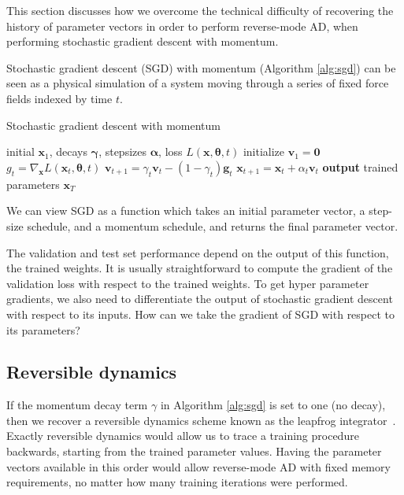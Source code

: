 \documentclass{article}
\newcommand{\vx}{\mathbf{x}}
\newcommand{\vv}{\mathbf{v}}
\newcommand{\vg}{\mathbf{g}}
\newcommand{\vzero}{\mathbf{0}}
\newcommand{\hypers}{{\boldsymbol{\theta}}}
\newcommand{\params}{\vx}
\newcommand{\decay}{\gamma}
\newcommand{\decays}{{\boldsymbol{\decay}}}
\newcommand{\stepsize}{\alpha}
\newcommand{\stepsizes}{{\boldsymbol{\stepsize}}}
\newcommand{\gradparams}{\nabla_\params L(\params_t, \hypers, t)}
\begin{document}
This section discusses how we overcome the technical difficulty of recovering the history of parameter vectors in order to perform reverse-mode AD, when performing stochastic gradient descent with momentum.

Stochastic gradient descent (SGD) with momentum (Algorithm \ref{alg:sgd}) can be seen as a physical simulation of a system moving through a series of fixed force fields indexed by time $t$.

%
\begin{algorithm}
   \caption{Stochastic gradient descent with momentum}
   \label{alg:sgd}
\begin{algorithmic}[1]
    initial $\vx_1$, decays $\decays$, stepsizes $\stepsizes$, loss $L(\params, \hypers, t)$
   \State initialize $\vv_1 = \vzero$
   \State $g_t = \gradparams$ 
   \State $\vv_{t+1} = \decay_t \vv_t - (1 - \decay_t) \vg_t$   \label{step:update velocity}
   \State $\vx_{t+1} = \vx_t + \stepsize_t \vv_t$  \label{step:update position}
   \EndFor
   \State \textbf{output} trained parameters $\vx_T$
\end{algorithmic}
\end{algorithm}
%

We can view SGD as a function which takes an initial parameter vector, a step-size schedule, and a momentum schedule, and returns the final parameter vector.

The validation and test set performance depend on the output of this function, the trained weights.
It is usually straightforward to compute the gradient of the validation loss with respect to the trained weights.
To get hyper parameter gradients, we also need to differentiate the output of stochastic gradient descent with respect to its inputs.
How can we take the gradient of SGD with respect to its parameters?

\subsection{Reversible dynamics}

If the momentum decay term $\decay$ in Algorithm \ref{alg:sgd} is set to one (no decay), then we recover a reversible dynamics scheme known as the leapfrog integrator~\citep{leapfrog1995}.
Exactly reversible dynamics would allow us to trace a training procedure backwards, starting from the trained parameter values.
Having the parameter vectors available in this order would allow reverse-mode AD with fixed memory requirements, no matter how many training iterations were performed.
\end{document}
